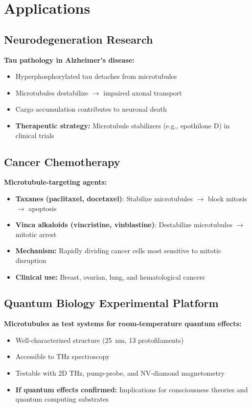 \section{Applications}

\subsection{Neurodegeneration Research}

\textbf{Tau pathology in Alzheimer's disease:}
\begin{itemize}
\item Hyperphosphorylated tau detaches from microtubules
\item Microtubules destabilize $\rightarrow$ impaired axonal transport
\item Cargo accumulation contributes to neuronal death
\item \textbf{Therapeutic strategy:} Microtubule stabilizers (e.g., epothilone D) in clinical trials
\end{itemize}

\subsection{Cancer Chemotherapy}

\textbf{Microtubule-targeting agents:}
\begin{itemize}
\item \textbf{Taxanes (paclitaxel, docetaxel)}: Stabilize microtubules $\rightarrow$ block mitosis $\rightarrow$ apoptosis
\item \textbf{Vinca alkaloids (vincristine, vinblastine)}: Destabilize microtubules $\rightarrow$ mitotic arrest
\item \textbf{Mechanism:} Rapidly dividing cancer cells most sensitive to mitotic disruption
\item \textbf{Clinical use:} Breast, ovarian, lung, and hematological cancers
\end{itemize}

\subsection{Quantum Biology Experimental Platform}

\textbf{Microtubules as test systems for room-temperature quantum effects:}
\begin{itemize}
\item Well-characterized structure (25~nm, 13 protofilaments)
\item Accessible to THz spectroscopy
\item Testable with 2D THz, pump-probe, and NV-diamond magnetometry
\item \textbf{If quantum effects confirmed:} Implications for consciousness theories and quantum computing substrates
\end{itemize}


